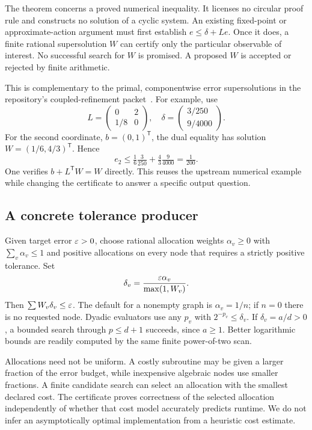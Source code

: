 The theorem concerns a proved numerical inequality. It licenses no circular proof rule and constructs no solution of a cyclic system. An existing fixed-point or approximate-action argument must first establish $e\le\delta+Le$. Once it does, a finite rational supersolution $W$ can certify only the particular observable of interest. No successful search for $W$ is promised. A proposed $W$ is accepted or rejected by finite arithmetic.

This is complementary to the primal, componentwise error supersolutions in the repository's coupled-refinement packet~\cite{repo-coupled}. For example, use
\[
 L=\begin{pmatrix}0&2\\1/8&0\end{pmatrix},\quad
 \delta=\begin{pmatrix}3/250\\9/4000\end{pmatrix}.
\]
For the second coordinate, $b=(0,1)^{\mathsf T}$, the dual equality has solution
$W=(1/6,4/3)^{\mathsf T}$. Hence
\[
 e_2\le\tfrac16\tfrac3{250}+\tfrac43\tfrac9{4000}
       =\tfrac1{200}.
\]
One verifies $b+L^{\mathsf T}W=W$ directly. This reuses the upstream numerical example while changing the certificate to answer a specific output question.

\subsection{A concrete tolerance producer}

Given target error $\varepsilon>0$, choose rational allocation weights $\alpha_v\ge0$ with $\sum_v\alpha_v\le1$ and positive allocations on every node that requires a strictly positive tolerance. Set
\begin{equation}\label{eq:tolerance}
 \delta_v=\frac{\varepsilon\alpha_v}{\max(1,W_v)}.
\end{equation}
Then $\sum W_v\delta_v\le\varepsilon$. The default for a nonempty graph is $\alpha_v=1/n$; if $n=0$ there is no requested node. Dyadic evaluators use any $p_v$ with $2^{-p_v}\le\delta_v$. If $\delta_v=a/d>0$, a bounded search through $p\le d+1$ succeeds, since $a\ge1$. Better logarithmic bounds are readily computed by the same finite power-of-two scan.

Allocations need not be uniform. A costly subroutine may be given a larger fraction of the error budget, while inexpensive algebraic nodes use smaller fractions. A finite candidate search can select an allocation with the smallest declared cost. The certificate proves correctness of the selected allocation independently of whether that cost model accurately predicts runtime. We do not infer an asymptotically optimal implementation from a heuristic cost estimate.

